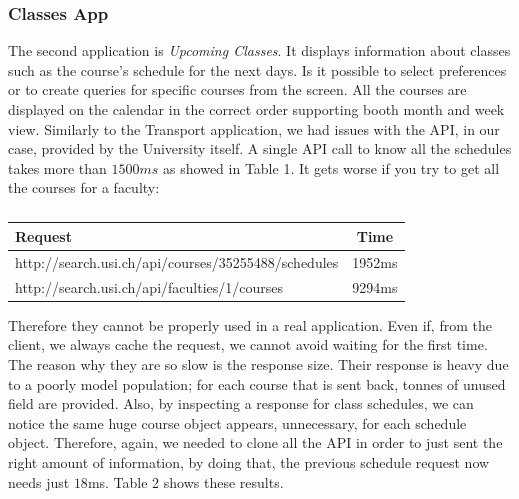 \documentclass[]{usiinfbachelorproject}
\begin{document}
\subsubsection{Classes App}
The second application is \emph{Upcoming Classes}. It displays information about classes such as the course's schedule for the next days. Is it possible to select preferences or to create queries for specific courses from the screen. All the courses are displayed on the calendar in the correct order supporting booth month and week view.
Similarly to the Transport application, we had issues with the API, in our case, provided by the University itself. A single API call to know all the schedules takes more than $1500ms$ as showed in Table 1. It gets worse if you try to get all the courses for a faculty:
\begin{table}[h]
\centering
\begin{tabular}{|l|c|}
\hline
Request & Time \\\hline
http://search.usi.ch/api/courses/35255488/schedules & 1952ms \\
http://search.usi.ch/api/faculties/1/courses & 9294ms\\\hline
\end{tabular}
\caption{}
\label{table:usi_request}
\end{table}
Therefore they cannot be properly used in a real application. Even if, from the client, we always cache the request, we cannot avoid waiting for the first time. The reason why they are so slow is the response size. Their response is heavy due to a poorly model population; for each course that is sent back, tonnes of unused field are provided. Also, by inspecting a response for class schedules, we can notice the same huge course object appears, unnecessary, for each schedule object.
Therefore, again, we needed to clone all the API in order to just sent the right amount of information, by doing that, the previous schedule request now needs just $18$ms. Table 2 shows these results.
\end{document}
